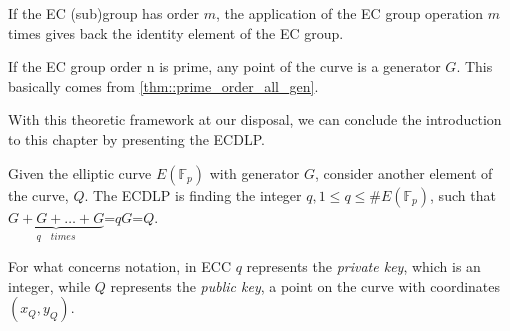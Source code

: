 \begin{myrem}
    If the EC (sub)group has order $m$, the application of the EC group operation $m$ times gives back the identity element of the EC group.
\end{myrem}
\begin{myrem}
    If the EC group order n is prime, any point of the curve is a generator $G$. This basically comes from \ref{thm::prime_order_all_gen}.
\end{myrem}
\noindent
With this theoretic framework at our disposal, we can conclude the introduction to this chapter by presenting the ECDLP.
\begin{mydef}
    Given the elliptic curve $E(\mathbb{F}_p)$ with generator $G$, consider another element of the curve, $Q$. The ECDLP is finding the integer $q, 1 \leq q \leq \#E(\mathbb{F}_p)$, such that $\underbrace{G+G+\dots+G}_{q \quad times}$=$qG$=$Q$.
\end{mydef}
\noindent
For what concerns notation, in ECC $q$ represents the \textit{private key}, which is an integer, while $Q$ represents the \textit{public key}, a point on the curve with coordinates $(x_Q, y_Q)$.

